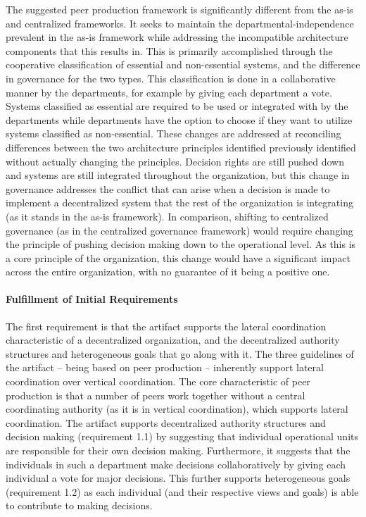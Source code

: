 The suggested peer production framework is significantly different from the as-is and centralized frameworks. It seeks to maintain the departmental-independence prevalent in the as-is framework while addressing the incompatible architecture components that this results in. This is primarily accomplished through the cooperative classification of essential and non-essential systems, and the difference in governance for the two types. This classification is done in a collaborative manner by the departments, for example by giving each department a vote. Systems classified as essential are required to be used or integrated with by the departments while departments have the option to choose if they want to utilize systems classified as non-essential. These changes are addressed at reconciling differences between the two architecture principles identified previously identified without actually changing the principles. Decision rights are still pushed down and systems are still integrated throughout the organization, but this change in governance addresses the conflict that can arise when a decision is made to implement a decentralized system that the rest of the organization is integrating (as it stands in the as-is framework). In comparison, shifting to centralized governance (as in the centralized governance framework) would require changing the principle of pushing decision making down to the operational level. As this is a core principle of the organization, this change would have a significant impact across the entire organization, with no guarantee of it being a positive one. 

\paragraph*{Fulfillment of Initial Requirements}

The first requirement is that the artifact supports the lateral coordination characteristic of a decentralized organization, and the decentralized authority structures and heterogeneous goals that go along with it. The three guidelines of the artifact -- being based on peer production -- inherently support lateral coordination over vertical coordination. The core characteristic of peer production is that a number of peers work together without a central coordinating authority (as it is in vertical coordination), which supports lateral coordination. The artifact supports decentralized authority structures and decision making (requirement 1.1) by suggesting that individual operational units are responsible for their own decision making. Furthermore, it suggests that the individuals in such a department make decisions collaboratively by giving each individual a vote for major decisions. This further supports heterogeneous goals (requirement 1.2) as each individual (and their respective views and goals) is able to contribute to making decisions.

